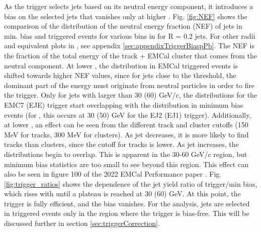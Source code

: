 As the trigger selects jets based on its neutral energy component, it introduces a bias on the selected jets that vanishes only at higher \pT. Fig. \ref{fig:NEF} shows the comparison of the distribution of the neutral energy fraction (NEF) of \pp jets in min. bias and triggered events for various bins in \pT for R = 0.2 jets. For other radii and equivalent plots in \pPb, see appendix \ref{sec:appendixTriggerBiaspPb}. The NEF is the fraction of the total energy of the track + EMCal cluster that comes from the neutral component. At lower \pT, the distribution in EMCal triggered events is shifted towards higher NEF values, since for jets close to the threshold, the dominant part of the energy must originate from neutral particles in order to fire the trigger. Only for jets with \pT larger than 30 (60) GeV/c, the distributions for the EMC7 (EJE) trigger start overlapping with the distribution in minimum bias events (for \pPb, this occurs at 30 (50) GeV for the EJ2 (EJ1) trigger). Additionally, at lower \pT, an effect can be seen from the different track and cluster \pT cutoffs (150 MeV for tracks, 300 MeV for clusters). As jet \pT decreases, it is more likely to find tracks than clusters, since the cutoff for tracks is lower. As jet \pT increases, the distributions begin to overlap. This is apparent in the 30-60 GeV/c region, but minimum bias statistics are too small to see beyond this \pT region. This effect can also be seen in figure 100 of the 2022 EMCal Performance paper \cite{EMCalPerformance}. Fig. \ref{fig:trigger_ratios} shows the \pT dependence of the jet yield ratio of trigger/min bias, which rises with \pT until a plateau is reached at 30 (60) GeV. At this point, the trigger is fully efficient, and the bias vanishes. For the analysis, jets are selected in triggered events only in the region where the trigger is bias-free. This will be discussed further in section \ref{sec:triggerCorrection}.

